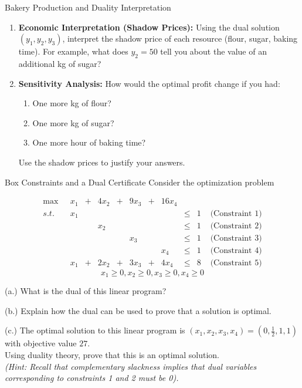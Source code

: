 \begin{ex}{Bakery Production and Duality Interpretation}{}
\begin{enumerate}
  \item \textbf{Economic Interpretation (Shadow Prices):}  
  Using the dual solution $(y_1, y_2, y_3)$, interpret the shadow price of each resource (flour, sugar, baking time). For example, what does $y_2 = 50$ tell you about the value of an additional kg of sugar?

  \item \textbf{Sensitivity Analysis:}  
  How would the optimal profit change if you had:
  \begin{enumerate}
    \item One more kg of flour?
    \item One more kg of sugar?
    \item One more hour of baking time?
  \end{enumerate}
  Use the shadow prices to justify your answers.
\end{enumerate}
\end{ex}

\begin{ex}{Box Constraints and a Dual Certificate}{}
\label{ex:cs-box-constraints}
 Consider the optimization problem

\begin{equation*}
\begin{array}{rrrrrrrrrrrrrrrrr}
\max \ \ \ &   x_1 &+ &4 x_2 &+& 9x_3 &+& 16 x_4&\\
s.t. \ \
& x_1& &&&&&&\leq &1& \text{ (Constraint 1)}\\
&&& x_2 &&&&&\leq &1& \text{ (Constraint 2)}\\
&&&&& x_3&&& \leq &1& \text{ (Constraint 3)}\\
&&&&&&& x_4 &\leq &1& \text{ (Constraint 4)}\\
& x_1 &+& 2x_2& + &3x_3 &+& 4x_4 &\leq &8 & \text{ (Constraint 5)}
\end{array}
\end{equation*}
$$ x_1 \geq 0, x_2 \geq 0, x_3 \geq 0, x_4 \geq 0
$$

(a.) What is the dual of this linear program?

(b.) Explain how the dual can be used to prove that a solution is optimal.

(c.) The optimal solution to this linear program is $(x_1, x_2, x_3, x_4) = (0,\tfrac{1}{2},1,1)$ with objective value $27$.  \\

Using duality theory, prove that this is an optimal solution.  \\
\textit{(Hint: Recall that complementary slackness implies that dual variables corresponding to constraints 1 and 2 must be 0).  }
\exrefs{Theorem~\ref{thm:weak-duality}, Theorem~\ref{thm:cs-optimality}}
\end{ex}


